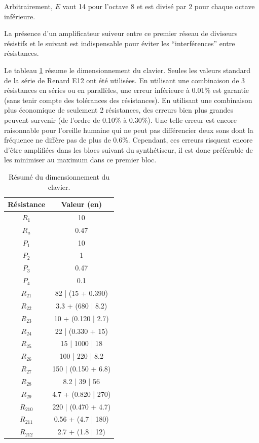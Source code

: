 Arbitrairement, $E$ vaut \unit{14}{\volt} pour l'octave
8 et est divisé par 2 pour chaque octave inférieure.

La présence d'un amplificateur suiveur entre ce premier
réseau de diviseurs résistifs et le suivant est indispensable
pour éviter les ``interférences'' entre résistances.

Le tableau \ref{tab:keyboard-dim} résume le dimensionnement
du clavier. Seules les valeurs standard de la série de Renard
E12 ont été utilisées. En utilisant une combinaison de 3
résistances en séries ou en parallèles, une erreur inférieure
à 0.01\% est garantie (sans tenir compte des tolérances des
résistances). En utilisant une combinaison plus économique
de seulement 2 résistances, des erreurs bien plus grandes
peuvent survenir (de l'ordre de 0.10\% à 0.30\%). Une telle
erreur est encore raisonnable pour l'oreille humaine qui ne
peut pas différencier deux sons dont la fréquence ne diffère
pas de plus de 0.6\%\cite{frequency-jnd}. Cependant, ces erreurs
risquent encore d'être amplifiées dans les blocs suivant du
synthétiseur, il est donc préférable de les minimiser au maximum
dans ce premier bloc.

\begin{table}[ht]
	\centering
		\begin{tabular}{|c|c|}
			\hline
				Résistance & Valeur (en\unit{}{\kilo\ohm}) \\
			\hline
				$R_1$ & 10 \\
			\hline
				$R_a$ & 0.47 \\
			\hline
				$P_1$ & 10 \\
			\hline
				$P_2$ & 1 \\
			\hline
				$P_3$ & 0.47 \\
			\hline
				$P_4$ & 0.1 \\
			\hline
				$R_{21}$ & 82 | (15 + 0.390) \\
			\hline
				$R_{22}$ & 3.3 + (680 | 8.2) \\
			\hline
				$R_{23}$ & 10 + (0.120 | 2.7) \\
			\hline
				$R_{24}$ & 22 | (0.330 + 15) \\
			\hline
				$R_{25}$ & 15 | 1000 | 18 \\
			\hline
				$R_{26}$ & 100 | 220 | 8.2 \\
			\hline
				$R_{27}$ & 150 | (0.150 + 6.8) \\
			\hline
				$R_{28}$ & 8.2 | 39 | 56 \\
			\hline
				$R_{29}$ & 4.7 + (0.820 | 270) \\
			\hline
				$R_{210}$ & 220 | (0.470 + 4.7) \\
			\hline
				$R_{211}$ & 0.56 + (4.7 | 180) \\
			\hline
				$R_{212}$ & 2.7 + (1.8 | 12) \\
			\hline
		\end{tabular}
	\caption{Résumé du dimensionnement du clavier.}
	\label{tab:keyboard-dim}
\end{table}

